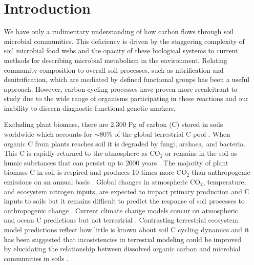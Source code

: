 \section{Introduction}
We have only a rudimentary understanding of how carbon flows through soil microbial communities. This deficiency is driven by the staggering complexity of soil microbial food webs and the opacity of these biological systems to current methods for describing microbial metabolism in the environment. Relating community composition to overall soil processes, such as nitrification and denitrification, which are mediated by defined functional groups has been a useful approach. However, carbon-cycling processes have proven more recalcitrant to study due to the wide range of organisms participating in these reactions and our inability to discern diagnostic functional genetic markers.
 
Excluding plant biomass, there are 2,300 Pg of carbon (C) stored in soils worldwide which accounts for $\sim$80\% of the global terrestrial C pool \cite{Amundson_2001,BATJES_1996}. When organic C from plants reaches soil it is degraded by fungi, archaea, and bacteria. This C is rapidly returned to the atmosphere as CO$_{2}$ or remains in the soil as humic substances that can persist up to 2000 years \cite{yanagita1990natural}. The majority of plant biomass C in soil is respired and produces 10 times more CO$_{2}$ than anthropogenic emissions on an annual basis \cite{chapin2002principles}. Global changes in atmospheric CO$_{2}$, temperature, and ecosystem nitrogen inputs, are expected to impact primary production and C inputs to soils \cite{Groenigen_2006} but it remains difficult to predict the response of soil processes to anthropogenic change \cite{DAVIDSON_2006}. Current climate change models concur on atmospheric and ocean C predictions but not terrestrial \cite{Friedlingstein_2006}. Contrasting terrestrial ecosystem model predictions reflect how little is known about soil C cycling dynamics and it has been suggested that incosistencies in terrestial modeling could be improved by elucidating the relationship between dissolved organic carbon and microbial communities in soils \cite{Neff_2001}. 

